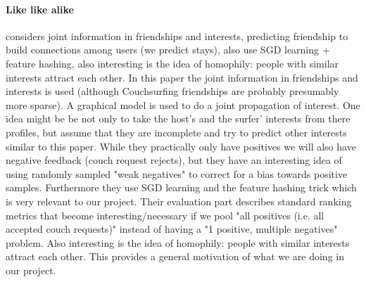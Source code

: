 \paragraph{Like like alike} \cite{Yang2011}
considers joint information in friendships and interests,  predicting friendship
to build connections among users (we predict stays), also use SGD learning + feature hashing, also interesting is the idea of homophily:  people with similar interests attract each other.
In this paper the joint information in friendships and interests is used (although Couchsurfing friendships are probably presumably more sparse).
A graphical model is used to do a joint propagation of interest.
One idea might be be not only to take the host's and the surfer' interests from there profiles, but assume that they are incomplete and try to predict other interests similar to this paper. While they practically only have positives we will also have negative feedback (couch request rejects), but they have an interesting idea of using randomly sampled "weak negatives" to correct for a bias towards positive samples.
Furthermore they use SGD learning and the feature hashing trick which is very relevant to our project.
Their evaluation part describes standard ranking metrics that become interesting/necessary if we pool "all positives (i.e. all accepted couch requests)" instead of having a "1 positive, multiple negatives" problem.
Also interesting is the idea of homophily: people with similar interests attract each other. This provides a general motivation of what we are doing in our project.

